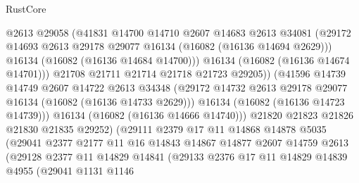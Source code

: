 \begin{lexlean}{RustCore}
\begin{coremodule}
                            @2613
                            @29058
                            (@41831
                              @14700
                              @14710
                              @2607
                              @14683
                              @2613
                              @34081
                              (@29172
                                @14693
                                @2613
                                @29178
                                @29077
                                @16134
                                (@16082 (@16136 @14694 @2629)))
                              @16134
                              (@16082 (@16136 @14684 @14700)))
                            @16134
                            (@16082 (@16136 @14674 @14701)))
                          @21708
                          @21711
                          @21714
                          @21718
                          @21723
                          @29205))
                      (@41596
                        @14739
                        @14749
                        @2607
                        @14722
                        @2613
                        @34348
                        (@29172 @14732 @2613 @29178 @29077 @16134 (@16082 (@16136 @14733 @2629)))
                        @16134
                        (@16082 (@16136 @14723 @14739)))
                      @16134
                      (@16082 (@16136 @14666 @14740)))
                    @21820
                    @21823
                    @21826
                    @21830
                    @21835
                    @29252)
                  (@29111
                    @2379
                    @17
                    @11
                    @14868
                    @14878
                    @5035
                    (@29041
                      @2377
                      @2177
                      @11
                      @16
                      @14843
                      @14867
                      @14877
                      @2607
                      @14759
                      @2613
                      (@29128
                        @2377
                        @11
                        @14829
                        @14841
                        (@29133
                          @2376
                          @17
                          @11
                          @14829
                          @14839
                          @4955
                          (@29041
                            @1131
                            @1146

\end{coremodule}
\end{lexlean}
